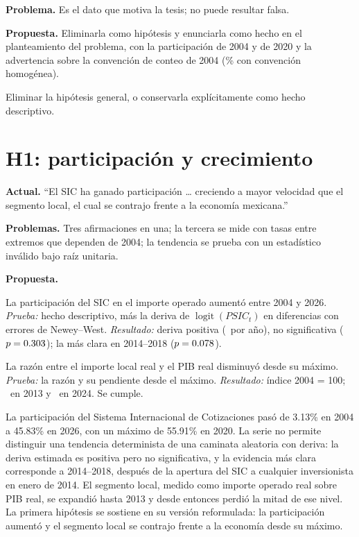 \documentclass[11pt,letterpaper]{article}
\newcommand{\PSIC}{\mathit{PSIC}}
\begin{document}
\textbf{Problema.} Es el dato que motiva la tesis; no puede resultar falsa.

\textbf{Propuesta.} Eliminarla como hipótesis y enunciarla como hecho en el planteamiento del problema, con la participación de 2004 y de 2020 y la advertencia sobre la convención de conteo de 2004 (\RamibCorregido\% con convención homogénea).

\begin{decision}Eliminar la hipótesis general, o conservarla explícitamente como hecho descriptivo.\end{decision}

\section{H1: participación y crecimiento}
\textbf{Actual.} ``El SIC ha ganado participación \ldots{} creciendo a mayor velocidad que el segmento local, el cual se contrajo frente a la economía mexicana.''

\textbf{Problemas.} Tres afirmaciones en una; la tercera se mide con tasas entre extremos que dependen de 2004; la tendencia se prueba con un estadístico inválido bajo raíz unitaria.

\textbf{Propuesta.}
\begin{description}[leftmargin=1.2em]
\item[H1a.] La participación del SIC en el importe operado aumentó entre 2004 y 2026. \emph{Prueba:} hecho descriptivo, más la deriva de $\operatorname{logit}(\PSIC_t)$ en diferencias con errores de Newey--West. \emph{Resultado:} deriva positiva (\RderivaAnual\ por año), no significativa ($p=0.303$); la más clara en 2014--2018 ($p=0.078$).
\item[H1b.] La razón entre el importe local real y el PIB real disminuyó desde su máximo. \emph{Prueba:} la razón y su pendiente desde el máximo. \emph{Resultado:} índice 2004 = 100; \RratioDosMilTrece\ en 2013 y \RratioDosMilVeinticuatro\ en 2024. Se cumple.
\end{description}

\begin{texto}
La participación del Sistema Internacional de Cotizaciones pasó de 3.13\% en 2004 a 45.83\% en 2026, con un máximo de 55.91\% en 2020. La serie no permite distinguir una tendencia determinista de una caminata aleatoria con deriva: la deriva estimada es positiva pero no significativa, y la evidencia más clara corresponde a 2014--2018, después de la apertura del SIC a cualquier inversionista en enero de 2014. El segmento local, medido como importe operado real sobre PIB real, se expandió hasta 2013 y desde entonces perdió la mitad de ese nivel. La primera hipótesis se sostiene en su versión reformulada: la participación aumentó y el segmento local se contrajo frente a la economía desde su máximo.
\end{texto}
\end{document}
